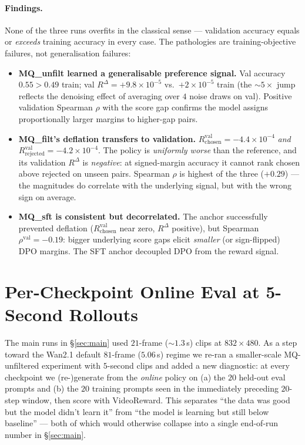 \documentclass{article}
\begin{document}
\paragraph{Findings.}  None of the three runs overfits in the classical sense --- validation accuracy equals or \emph{exceeds} training accuracy in every case.  The pathologies are training-objective failures, not generalisation failures:
\begin{itemize}
\item \textbf{MQ\_unfilt learned a generalisable preference signal.}  Val accuracy $0.55 > 0.49$ train; val $R^{\Delta} = +9.8{\times}10^{-5}$ vs.\ $+2{\times}10^{-5}$ train (the $\sim 5{\times}$ jump reflects the denoising effect of averaging over $4$ noise draws on val).  Positive validation Spearman $\rho$ with the score gap confirms the model assigns proportionally larger margins to higher-gap pairs.
\item \textbf{MQ\_filt's deflation transfers to validation.}  $R_{\text{chosen}}^{\text{val}} = -4.4{\times}10^{-4}$ \emph{and} $R_{\text{rejected}}^{\text{val}} = -4.2{\times}10^{-4}$.  The policy is \emph{uniformly worse} than the reference, and its validation $R^{\Delta}$ is \emph{negative}: at signed-margin accuracy it cannot rank chosen above rejected on unseen pairs.  Spearman $\rho$ is highest of the three ($+0.29$) --- the magnitudes do correlate with the underlying signal, but with the wrong sign on average.
\item \textbf{MQ\_sft is consistent but decorrelated.}  The anchor successfully prevented deflation ($R_{\text{chosen}}^{\text{val}}$ near zero, $R^{\Delta}$ positive), but Spearman $\rho^{\text{val}} = -0.19$: bigger underlying score gaps elicit \emph{smaller} (or sign-flipped) DPO margins.  The SFT anchor decoupled DPO from the reward signal.
\end{itemize}

\section{Per-Checkpoint Online Eval at 5-Second Rollouts}
\label{sec:scale5s}

The main runs in \S\ref{sec:main} used $21$-frame ($\sim 1.3$\,s) clips at $832{\times}480$.  As a step toward the Wan2.1 default $81$-frame ($5.06$\,s) regime we re-ran a smaller-scale MQ-unfiltered experiment with $5$-second clips and added a new diagnostic: at every checkpoint we (re-)generate from the \emph{online} policy on (a) the $20$ held-out eval prompts and (b) the $20$ training prompts seen in the immediately preceding $20$-step window, then score with VideoReward.  This separates ``the data was good but the model didn't learn it'' from ``the model is learning but still below baseline'' --- both of which would otherwise collapse into a single end-of-run number in \S\ref{sec:main}.
\end{document}
